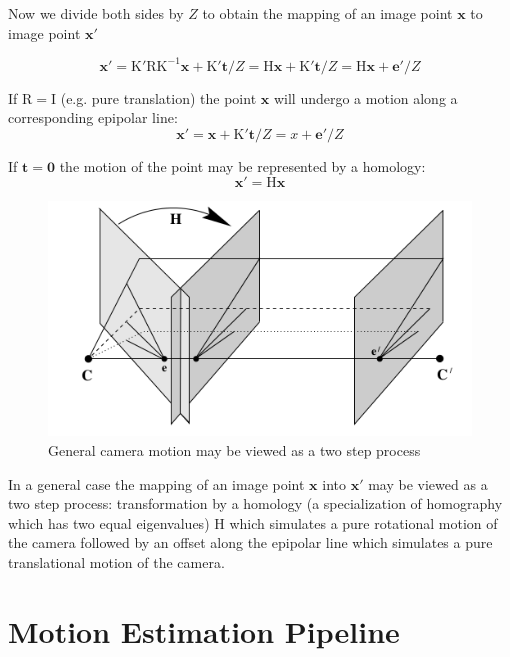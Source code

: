 \documentclass[runningheads]{llncs}
\begin{document}
Now we divide both sides by $Z$ to obtain the mapping of an image point $\mathbf{x}$ to image point $\mathbf{x}'$

\begin{equation}
  \label{eq:general_point_motion}
  \mathbf{x}' = \mathrm{K'RK^{-1}}\mathbf{x} + \mathrm{K'}\mathbf{t}/Z = \mathrm{H}\mathbf{x}+ \mathrm{K'}\mathbf{t}/Z = \mathrm{H}\mathbf{x} + \mathbf{e'}/Z
\end{equation}

If $\mathrm{R = I}$ (e.g. pure translation) the point $\mathbf{x}$ will undergo a motion along a corresponding epipolar line:
\begin{equation}
\mathbf{x}' = \mathbf{x}+ \mathrm{K'}\mathbf{t}/Z = x+\mathbf{e}'/Z
\end{equation}

If $\mathbf{t} = \mathbf{0}$ the motion of the point may be represented by a homology:
\[
\mathbf{x}' = \mathrm{H}\mathbf{x}
\]

\begin{figure}[h]
\includegraphics[scale=.3]{general_camera_motion}
\centering
\caption{General camera motion may be viewed as a two step process}
\end{figure}

In a general case the mapping of an image point $\mathbf{x}$ into $\mathbf{x}'$ may be viewed as a two step process: transformation by a homology (a specialization of homography which has two equal eigenvalues) $\mathrm{H}$ which simulates a pure rotational motion of the camera followed by an offset along the epipolar line which simulates a pure translational motion of the camera.

\section{Motion Estimation Pipeline}
\end{document}
